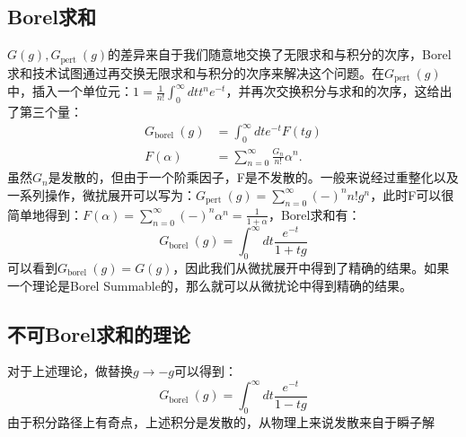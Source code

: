 \documentclass[10pt,openany]{book}
\theoremstyle{thmstyle} %
\theoremstyle{defstyle} %
\theoremstyle{prostyle} %
\begin{document}
\subsection*{Borel求和}
$ G(g),G_{\text {pert }}(g) $的差异来自于我们随意地交换了无限求和与积分的次序，Borel求和技术试图通过再交换无限求和与积分的次序来解决这个问题。在$ G_{\text {pert }}(g) $中，插入一个单位元：$ 1=\frac{1}{n !} \int_0^{\infty} d t t^n e^{-t} $，并再次交换积分与求和的次序，这给出了第三个量：
\begin{equation}
  \begin{aligned}
    G_{\text {borel }}(g) & =\int_0^{\infty} d t e^{-t} F(t g) \\
    F(\alpha) & =\sum_{n=0}^{\infty} \frac{G_n}{n !} \alpha^n .
    \end{aligned}
\end{equation} 
虽然$ G_n $是发散的，但由于一个阶乘因子，F是不发散的。一般来说经过重整化以及一系列操作，微扰展开可以写为：$ G_{\text {pert }}(g)=\sum_{n=0}^{\infty}(-)^n n ! g^n $，此时F可以很简单地得到：$ F(\alpha)=\sum_{n=0}^{\infty}(-)^n \alpha^n=\frac{1}{1+\alpha} $，Borel求和有： 
\begin{equation}
  G_{\text {borel }}(g)=\int_0^{\infty} d t \frac{e^{-t}}{1+t g}
\end{equation}
可以看到$ G_{\text {borel }}(g)=G(g) $，因此我们从微扰展开中得到了精确的结果。如果一个理论是Borel Summable的，那么就可以从微扰论中得到精确的结果。
\subsection*{不可Borel求和的理论}
对于上述理论，做替换$ g\to-g $可以得到：
\begin{equation}
  G_{\text {borel }}(g)=\int_0^{\infty} d t \frac{e^{-t}}{1-t g}
\end{equation}  
由于积分路径上有奇点，上述积分是发散的，从物理上来说发散来自于瞬子解
\end{document}
